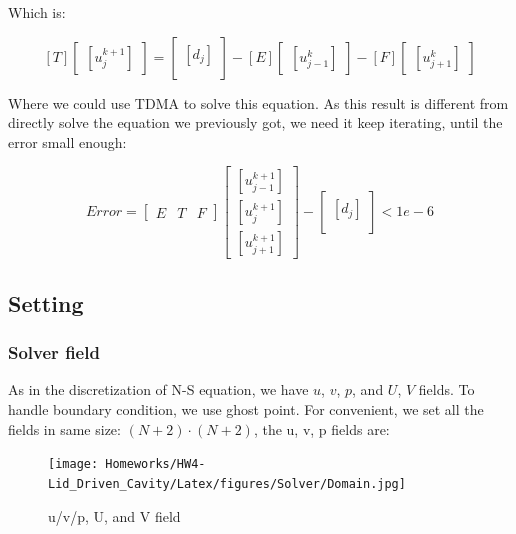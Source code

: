 \documentclass[12pt]{article}
\begin{document}
Which is:

\[
\left[
T
\right]
\begin{bmatrix}
    [u_{j}^{k+1}]
\end{bmatrix}
=
\begin{bmatrix}
    [d_{j}] \\
\end{bmatrix}
-
\left[
E
\right]
\begin{bmatrix}
    [u_{j-1}^{k}]
\end{bmatrix}
-
\left[
F
\right]
\begin{bmatrix}
    [u_{j+1}^{k}]
\end{bmatrix}
\]







Where we could use TDMA to solve this equation. As this result is different from directly solve the equation we previously got, we need it keep iterating, until the error small enough:


\[ 
Error = 
\left[
\begin{array}{c|c|c}
E & T & F 
\end{array}
\right]
\begin{bmatrix}
    [u_{j-1}^{k+1}] \\
    [u_{j}^{k+1}] \\
   [ u_{j+1}^{k+1}]
\end{bmatrix}
-
\begin{bmatrix}
    [d_{j}] \\
\end{bmatrix}
<1e-6
\]



\subsection{Setting}
\subsubsection{Solver field}
As in the discretization of N-S equation, we have $u$, $v$, $p$, and $U$, $V$ fields. To handle boundary condition, we use ghost point. For convenient, we set all the fields in same size: $(N+2) \cdot (N+2)$, the u, v, p fields are:

\begin{figure}[H]
    \centering
    \texttt{[image: Homeworks/HW4-Lid\_Driven\_Cavity/Latex/figures/Solver/Domain.jpg]}
    \caption{u/v/p, U, and V field}
\end{figure}
\end{document}
